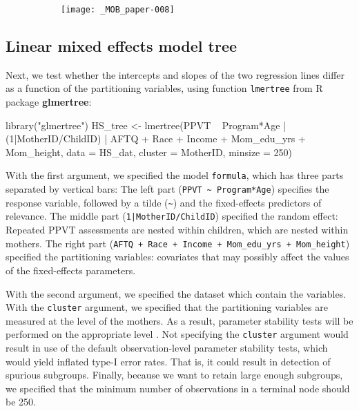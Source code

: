 \documentclass[doc,floatsintext,natbib]{apa7}
\begin{document}
\begin{figure}%
\caption{}
\begin{subfigure}{.7\textwidth}
\texttt{[image: \_MOB\_paper-008]}
\end{subfigure}
\label{fig:global_lmm}
\end{figure}%


\FloatBarrier
\subsection{Linear mixed effects model tree}

Next, we test whether the intercepts and slopes of the two regression lines differ as a function of the partitioning variables, using function \verb|lmertree| from R package \textbf{glmertree}:

\begin{Schunk}
\begin{Sinput}
 library("glmertree")
 HS_tree <- lmertree(PPVT ~ Program*Age | (1|MotherID/ChildID) | AFTQ + Race + 
                       Income + Mom_edu_yrs + Mom_height, 
                     data = HS_dat, cluster = MotherID, minsize = 250)
\end{Sinput}
\end{Schunk}

With the first argument, we specified the model \verb|formula|, which has three parts separated by vertical bars: The left part (\verb|PPVT ~ Program*Age|) specifies the response variable, followed by a tilde (\verb|~|) and the fixed-effects predictors of relevance. The middle part (\texttt{1|MotherID/ChildID}) specified the random effect: Repeated PPVT assessments are nested within children, which are nested within mothers. The right part (\verb|AFTQ + Race + Income + Mom_edu_yrs + Mom_height|) specified the partitioning variables: covariates that may possibly affect the values of the fixed-effects parameters. 

With the second argument, we specified the dataset which contain the variables. With the \texttt{cluster} argument, we specified that the partitioning variables are measured at the level of the mothers. As a result, parameter stability tests will be performed on the appropriate level \citep{FokkyZeil23}. Not specifying the \texttt{cluster} argument would result in use of the default observation-level parameter stability tests, which would yield inflated type-I error rates. That is, it could result in detection of spurious subgroups. Finally, because we want to retain large enough subgroups, we specified that the minimum number of observations in a terminal node should be 250.
\end{document}
